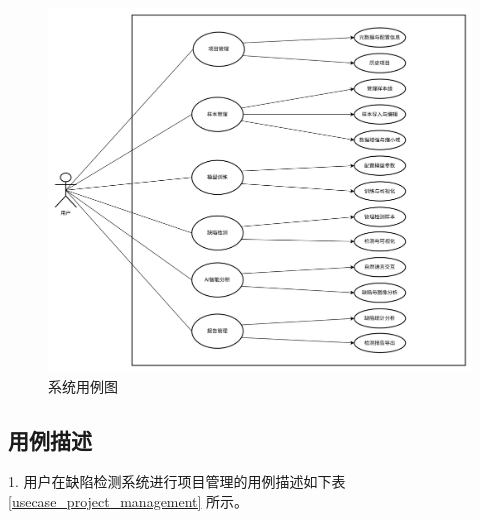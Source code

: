 \documentclass[
  ]{njuthesis}
\begin{document}
\begin{figure}[htb]
    \centering
    \includegraphics[width=\textwidth]{images/用例图.png}
    \caption{系统用例图}
    \label{系统用例图}
\end{figure}

\subsection{用例描述}

1. 用户在缺陷检测系统进行项目管理的用例描述如下表 \ref{usecase_project_management} 所示。
\end{document}
